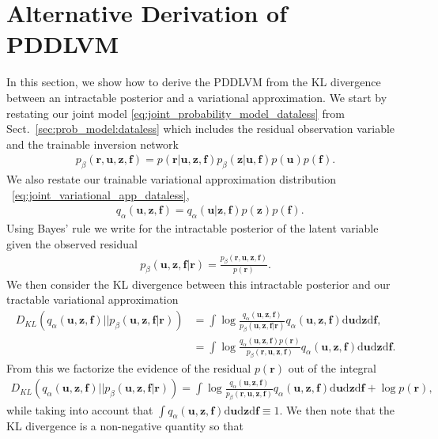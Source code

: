 \documentclass[11pt, fleqn]{article}
\def\z{{\mathbf z}}
\def\fbf{{\mathbf f}}
\def\ubf{{\mathbf u}}
\def\r{{\mathbf r}}
\def\md{{\mathrm d}}
\begin{document}
\section{Alternative Derivation of {PDDLVM}}\label{sec:KLDivELBO}
%
In this section, we show how to derive the \gls*{PDDLVM} from the KL divergence between an intractable posterior and a variational approximation. We start by restating our joint model \eqref{eq:joint_probability_model_dataless} from Sect.~\ref{sec:prob_model:dataless} which includes the residual observation variable and the trainable inversion network
\begin{align}\label{eq:app:prob_model}
    p_\beta(\r,\ubf,\z, \fbf) = p(\r|\ubf,\z, \fbf)p_\beta(\z|\ubf, \fbf)p(\ubf)p(\fbf) .
\end{align}
We also restate our trainable variational approximation distribution ~\eqref{eq:joint_variational_app_dataless},
\begin{align}\label{eq:app:prob_var}
    &q_\alpha(\ubf, \z, \fbf) = q_\alpha(\ubf|\z,\fbf)p(\z)p(\fbf).
\end{align}
Using Bayes' rule we write for the intractable posterior of the latent variable given the observed residual
\begin{align}
    p_\beta(\ubf,\z,\fbf|\r) = \frac{p_\beta(\r,\ubf,\z,\fbf)}{p(\r)}.
\end{align}
We then consider the KL divergence between this intractable posterior and our tractable variational approximation
\begin{align}
    D_{KL}( q_\alpha(\ubf, \z, \fbf)||p_\beta(\ubf,\z,\fbf|\r)) &= \int \log \frac{q_\alpha(\ubf, \z, \fbf)}{p_\beta(\ubf,\z,\fbf|\r)}q_\alpha(\ubf, \z, \fbf)\md \ubf \md \z \md \fbf, \\
    &=\int \log \frac{q_\alpha(\ubf, \z, \fbf)p(\r)}{p_\beta(\r,\ubf,\z,\fbf)}q_\alpha(\ubf, \z, \fbf)\md \ubf \md \z \md \fbf \nonumber.
\end{align}
From this we factorize the evidence of the residual $p(\r)$ out of the integral
\begin{align}
    D_{KL}( q_\alpha(\ubf, \z, \fbf)||p_\beta(\ubf,\z,\fbf|\r)) = \int \log \frac{q_\alpha(\ubf, \z, \fbf)}{p_\beta(\r,\ubf,\z,\fbf)}q_\alpha(\ubf, \z, \fbf)\md \ubf \md \z \md \fbf +  \log p(\r) ,
\end{align}
while taking into account that $ \int q_\alpha(\ubf, \z, \fbf) \md \ubf \md \z \md \fbf \equiv 1 $. We then note that the KL divergence is a non-negative  quantity so that 
\end{document}
